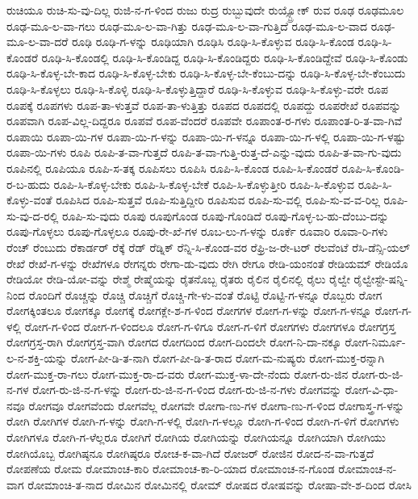 {ರುಚಿಯೂ
ರುಚಿ-ಸು-ವು-ದಿಲ್ಲ
ರುಜಿ-ನ-ಗ-ಳಿಂದ
ರುಜು
ರುದ್ರ
ರುಬ್ಬುವುದೇ
ರುಯ್ಸ್ಬ್ರೋಕ್
ರುವ
ರೂಢ
ರೂಢಮೂಲ
ರೂಢ-ಮೂ-ಲ-ವಾ-ಗಲು
ರೂಢ-ಮೂ-ಲ-ವಾ-ಗಿತ್ತು
ರೂಢ-ಮೂ-ಲ-ವಾ-ಗುತ್ತಿದೆ
ರೂಢ-ಮೂ-ಲ-ವಾದ
ರೂಢ-ಮೂ-ಲ-ವಾ-ದರೆ
ರೂಢಿ
ರೂಢಿ-ಗ-ಳನ್ನು
ರೂಢಿಯಾಗಿ
ರೂಢಿಸಿ
ರೂಢಿ-ಸಿ-ಕೊಳ್ಳುವ
ರೂಢಿ-ಸಿ-ಕೊಂಡ
ರೂಢಿ-ಸಿ-ಕೊಂಡರೆ
ರೂಢಿ-ಸಿ-ಕೊಂಡಲ್ಲಿ
ರೂಢಿ-ಸಿ-ಕೊಂಡಿದ್ದ
ರೂಢಿ-ಸಿ-ಕೊಂಡಿದ್ದರು
ರೂಢಿ-ಸಿ-ಕೊಂಡಿದ್ದೇವೆ
ರೂಢಿ-ಸಿ-ಕೊಂಡು
ರೂಢಿ-ಸಿ-ಕೊಳ್ಳ-ಬೇ-ಕಾದ
ರೂಢಿ-ಸಿ-ಕೊಳ್ಳ-ಬೇಕು
ರೂಢಿ-ಸಿ-ಕೊಳ್ಳ-ಬೇ-ಕೆಂಬು-ದನ್ನು
ರೂಢಿ-ಸಿ-ಕೊಳ್ಳ-ಬೇ-ಕೆಂಬುದು
ರೂಢಿ-ಸಿ-ಕೊಳ್ಳಲು
ರೂಢಿ-ಸಿ-ಕೊಳ್ಳಿ
ರೂಢಿ-ಸಿ-ಕೊಳ್ಳುತ್ತಿದ್ದಾರೆ
ರೂಢಿ-ಸಿ-ಕೊಳ್ಳುವ
ರೂಢಿ-ಸಿ-ಕೊಳ್ಳು-ವರೇ
ರೂಪ
ರೂಪಕ್ಕೆ
ರೂಪಗಳು
ರೂಪ-ತಾ-ಳುತ್ತವೆ
ರೂಪ-ತಾ-ಳುತ್ತಿತ್ತು
ರೂಪದ
ರೂಪದಲ್ಲಿ
ರೂಪದ್ದು
ರೂಪರೇಖೆ
ರೂಪವನ್ನು
ರೂಪವಾಗಿ
ರೂಪ-ವಿಲ್ಲ-ದಿದ್ದರೂ
ರೂಪವೆ
ರೂಪ-ವೆಂದರೆ
ರೂಪವೇ
ರೂಪಾಂತ-ರ-ಗಳು
ರೂಪಾಂತ-ರಿ-ತ-ವಾ-ಗಿವೆ
ರೂಪಾಯಿ
ರೂಪಾ-ಯಿ-ಗಳ
ರೂಪಾ-ಯಿ-ಗ-ಳನ್ನು
ರೂಪಾ-ಯಿ-ಗ-ಳನ್ನೂ
ರೂಪಾ-ಯಿ-ಗ-ಳಲ್ಲಿ
ರೂಪಾ-ಯಿ-ಗ-ಳಷ್ಟು
ರೂಪಾ-ಯಿ-ಗಳು
ರೂಪಿ
ರೂಪಿ-ತ-ವಾ-ಗುತ್ತದೆ
ರೂಪಿ-ತ-ವಾ-ಗುತ್ತಿ-ರುತ್ತ-ದೆ-ಎನ್ನು-ವುದು
ರೂಪಿ-ತ-ವಾ-ಗು-ವುದು
ರೂಪಿನಲ್ಲಿ
ರೂಪಿಯೂ
ರೂಪಿ-ಸ-ತಕ್ಕ
ರೂಪಿಸಲು
ರೂಪಿಸಿ
ರೂಪಿ-ಸಿ-ಕೊಂಡ
ರೂಪಿ-ಸಿ-ಕೊಂಡರೆ
ರೂಪಿ-ಸಿ-ಕೊಂಡಿ-ರ-ಬ-ಹುದು
ರೂಪಿ-ಸಿ-ಕೊಳ್ಳ-ಬೇಕು
ರೂಪಿ-ಸಿ-ಕೊಳ್ಳ-ಬೇಕೆ
ರೂಪಿ-ಸಿ-ಕೊಳ್ಳುತ್ತೀರಿ
ರೂಪಿ-ಸಿ-ಕೊಳ್ಳುವ
ರೂಪಿ-ಸಿ-ಕೊಳ್ಳು-ವಂತೆ
ರೂಪಿಸಿದ
ರೂಪಿ-ಸುತ್ತವೆ
ರೂಪಿ-ಸುತ್ತಿದ್ದೀರಿ
ರೂಪಿಸುವ
ರೂಪಿ-ಸು-ವಲ್ಲಿ
ರೂಪಿ-ಸು-ವ-ವ-ರಿಲ್ಲ
ರೂಪಿ-ಸು-ವು-ದ-ರಲ್ಲಿ
ರೂಪಿ-ಸು-ವುದು
ರೂಪು
ರೂಪುಗೊಂಡ
ರೂಪು-ಗೊಂಡಿದೆ
ರೂಪು-ಗೊಳ್ಳ-ಬ-ಹು-ದೆಂಬು-ದನ್ನು
ರೂಪು-ಗೊಳ್ಳಲು
ರೂಪು-ಗೊಳ್ಳಲೂ
ರೂಪು-ರೇ-ಖೆ-ಗಳ
ರೂಬ-ಲು-ಗ-ಳನ್ನು
ರೂರ್ಕೆ
ರೂವಾರಿ
ರೂವಾ-ರಿ-ಗಳು
ರೆಂಚ್
ರೆಂಬುದು
ರೆಕಾರ್ಡರ್
ರೆಕ್ಕೆ
ರೆಡ್
ರೆಡ್ನಿಕ್
ರೆನ್ನಿ-ಸಿ-ಕೊಂಡ-ವರ
ರೆಫ್ರಿ-ಜ-ರೇ-ಟರ್
ರೆಲವೆಂಟೆ
ರೆಸಿ-ಡೆನ್ಸಿ-ಯಲ್
ರೇಖೆ
ರೇಖೆ-ಗ-ಳನ್ನು
ರೇಖೆಗಳೂ
ರೇಗನ್ನರು
ರೇಗಾ-ಡು-ವುದು
ರೇಗಿ
ರೇಗೂ
ರೇಡಿ-ಯಂನಂತೆ
ರೇಡಿಯಮ್
ರೇಡಿಯೊ
ರೇಡಿಯೋ
ರೇಡಿ-ಯೋ-ವನ್ನು
ರೇಶ್ಮೆ
ರೇಷ್ಮೆಯನ್ನು
ರೈತನೊಬ್ಬ
ರೈತರು
ರೈಲಿನ
ರೈಲಿನಲ್ಲಿ
ರೈಲು
ರೈಲ್ವೇ
ರೈಲ್ವೇಸ್ಟೇ-ಷನ್ನಿ-ನಿಂದ
ರೊಂದಿಗೆ
ರೊಚ್ಚನ್ನು
ರೊಚ್ಚಿ
ರೊಚ್ಚಿಗೆ
ರೊಚ್ಚಿ-ಗೇ-ಳು-ವಂತೆ
ರೊಟ್ಟಿ
ರೊಟ್ಟಿ-ಗ-ಳನ್ನೂ
ರೊಬ್ಬರು
ರೋಗ
ರೋಗಕ್ಕಿಂತಲೂ
ರೋಗಕ್ಕೂ
ರೋಗಕ್ಕೆ
ರೋಗಕ್ಲೇ-ಶ-ಗ-ಳಿಂದ
ರೋಗಗಳ
ರೋಗ-ಗ-ಳನ್ನು
ರೋಗ-ಗ-ಳನ್ನೂ
ರೋಗ-ಗ-ಳಲ್ಲಿ
ರೋಗ-ಗ-ಳಿಂದ
ರೋಗ-ಗ-ಳಿಂದಲೂ
ರೋಗ-ಗ-ಳಿಗೂ
ರೋಗ-ಗ-ಳಿಗೆ
ರೋಗಗಳು
ರೋಗಗಳೂ
ರೋಗಗ್ರಸ್ತ
ರೋಗಗ್ರಸ್ತ-ರಾಗಿ
ರೋಗಗ್ರಸ್ತ-ವಾಗಿ
ರೋಗದ
ರೋಗದಿಂದ
ರೋಗ-ದಿಂದಲೇ
ರೋಗ-ನಿ-ದಾ-ನಕ್ಕೂ
ರೋಗ-ನಿರ್ಮೂ-ಲ-ನ-ಶಕ್ತಿ-ಯನ್ನು
ರೋಗ-ಪೀ-ಡಿ-ತ-ನಾಗಿ
ರೋಗ-ಪೀ-ಡಿ-ತ-ರಾದ
ರೋಗ-ಮ-ನುಷ್ಯರು
ರೋಗ-ಮುಕ್ತ-ರನ್ನಾಗಿ
ರೋಗ-ಮುಕ್ತ-ರಾ-ಗಲು
ರೋಗ-ಮುಕ್ತ-ರಾ-ದ-ವರು
ರೋಗ-ಮುಕ್ತ-ಳಾ-ದೇ-ನೆಂದು
ರೋಗ-ರು-ಜಿನ
ರೋಗ-ರು-ಜಿ-ನ-ಗಳ
ರೋಗ-ರು-ಜಿ-ನ-ಗ-ಳನ್ನು
ರೋಗ-ರು-ಜಿ-ನ-ಗ-ಳಿಂದ
ರೋಗ-ರು-ಜಿ-ನ-ಗಳು
ರೋಗವನ್ನು
ರೋಗ-ವಿ-ಧಾ-ನವೂ
ರೋಗವೂ
ರೋಗವೆಂದು
ರೋಗವೆಲ್ಲ
ರೋಗವೇ
ರೋಗಾ-ಣು-ಗಳ
ರೋಗಾ-ಣು-ಗ-ಳಿಂದ
ರೋಗಾಸ್ತ್ರ-ಗ-ಳನ್ನು
ರೋಗಿ
ರೋಗಿಗಳ
ರೋಗಿ-ಗ-ಳನ್ನು
ರೋಗಿ-ಗ-ಳಲ್ಲಿ
ರೋಗಿ-ಗ-ಳಲ್ಲೂ
ರೋಗಿ-ಗ-ಳಿಂದ
ರೋಗಿ-ಗ-ಳಿಗೆ
ರೋಗಿಗಳು
ರೋಗಿಗಳೂ
ರೋಗಿ-ಗ-ಳೆಲ್ಲರೂ
ರೋಗಿಗೆ
ರೋಗಿಯ
ರೋಗಿಯನ್ನು
ರೋಗಿಯನ್ನೂ
ರೋಗಿಯಾಗಿ
ರೋಗಿಯು
ರೋಗಿಯೊಬ್ಬ
ರೋಗಿಷ್ಠನೂ
ರೋಗಿಷ್ಠರೂ
ರೋಚ-ಕ-ವಾ-ಗಿದೆ
ರೋಜರ್
ರೋಜಿನ
ರೋದ-ನ-ವಾ-ಗುತ್ತದೆ
ರೋಪಣೆಯ
ರೋಮ
ರೋಮಾಂಚ-ಕಾರಿ
ರೋಮಾಂಚ-ಕಾ-ರಿ-ಯಾದ
ರೋಮಾಂಚ-ನ-ಗೊಂಡ
ರೋಮಾಂಚ-ನ-ವಾಗ
ರೋಮಾಂಚಿ-ತ-ನಾದ
ರೋಮಿನ
ರೋಮಿನಲ್ಲಿ
ರೋಮ್
ರೋಷದ
ರೋಷವನ್ನು
ರೋಷಾ-ವೇ-ಶ-ದಿಂದ
ರೋಸಿ
}
